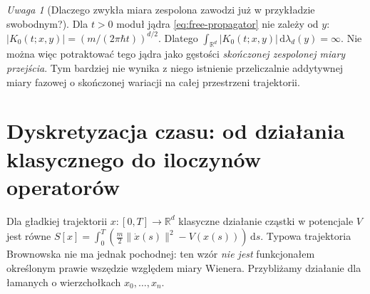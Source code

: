 \documentclass[11pt,a4paper,oneside]{report}
\numberwithin{equation}{chapter}
\theoremstyle{plain}
\theoremstyle{definition}
\theoremstyle{remark}
\newtheorem{uwaga}{Uwaga}[chapter]
\newcommand{\R}{\mathbb{R}}
\newcommand{\dd}{\mathrm{d}}
\begin{document}
\begin{uwaga}[Dlaczego zwykła miara zespolona zawodzi już w przykładzie swobodnym?]
Dla $t>0$ moduł jądra \eqref{eq:free-propagator}
nie zależy od $y$:
$|K_0(t;x,y)|=(m/(2\pi\hbar t))^{d/2}$.
Dlatego $\int_{\R^d}|K_0(t;x,y)|\,\dd\lambda_d(y)=\infty$.
Nie można więc potraktować tego jądra jako gęstości
\emph{skończonej zespolonej miary przejścia}.
Tym bardziej nie wynika z niego istnienie przeliczalnie
addytywnej miary fazowej o skończonej wariacji na
całej przestrzeni trajektorii.
\end{uwaga}

\section{Dyskretyzacja czasu: od działania klasycznego do iloczynów operatorów}\label{sec:volIII:16:05}

Dla gładkiej trajektorii $x:[0,T]\to\R^d$ klasyczne
działanie cząstki w potencjale $V$ jest równe
$S[x]=\int_0^T(\frac m2\|\dot x(s)\|^2-V(x(s)))\,\dd s$.
Typowa trajektoria Brownowska nie ma jednak pochodnej:
ten wzór \emph{nie jest} funkcjonałem określonym prawie
wszędzie względem miary Wienera. Przybliżamy działanie
dla łamanych o wierzchołkach $x_0,\ldots,x_n$.
\end{document}
